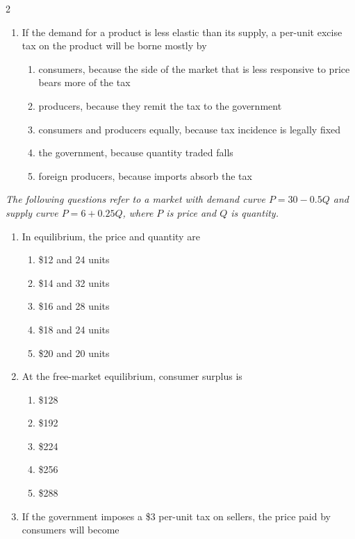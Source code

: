 \documentclass[10pt]{article}
\newenvironment{choiceslist}
  {\begin{enumerate}[label=(\Alph*), leftmargin=1.6em, itemsep=0.12em, topsep=0.18em, parsep=0pt]}
  {\end{enumerate}}
\newenvironment{stimulus}
  {\begin{center}\begin{minipage}{0.96\columnwidth}\footnotesize\itshape\setlength{\tabcolsep}{3pt}\renewcommand{\arraystretch}{0.96}}
  {\end{minipage}\end{center}}
\begin{document}
\begin{multicols*}{2}
\begin{enumerate}[resume*=apq, leftmargin=*, itemsep=0.85em, topsep=0.2em, parsep=0pt]
\begin{choiceslist}
\item remain unchanged because the good is a luxury
\end{choiceslist}
\item If the demand for a product is less elastic than its supply, a per-unit excise tax on the product will be borne mostly by
\begin{choiceslist}
\item consumers, because the side of the market that is less responsive to price bears more of the tax
\item producers, because they remit the tax to the government
\item consumers and producers equally, because tax incidence is legally fixed
\item the government, because quantity traded falls
\item foreign producers, because imports absorb the tax
\end{choiceslist}
\end{enumerate}
\begin{stimulus}
The following questions refer to a market with demand curve $P = 30 - 0.5Q$ and supply curve $P = 6 + 0.25Q$, where $P$ is price and $Q$ is quantity.
\end{stimulus}
\begin{enumerate}[resume*=apq, leftmargin=*, itemsep=0.85em, topsep=0.2em, parsep=0pt]
\item In equilibrium, the price and quantity are
\begin{choiceslist}
\item \$12 and 24 units
\item \$14 and 32 units
\item \$16 and 28 units
\item \$18 and 24 units
\item \$20 and 20 units
\end{choiceslist}
\item At the free-market equilibrium, consumer surplus is
\begin{choiceslist}
\item \$128
\item \$192
\item \$224
\item \$256
\item \$288
\end{choiceslist}
\item If the government imposes a \$3 per-unit tax on sellers, the price paid by consumers will become
\begin{choiceslist}

\end{choiceslist}
\end{enumerate}
\end{multicols*}
\end{document}
